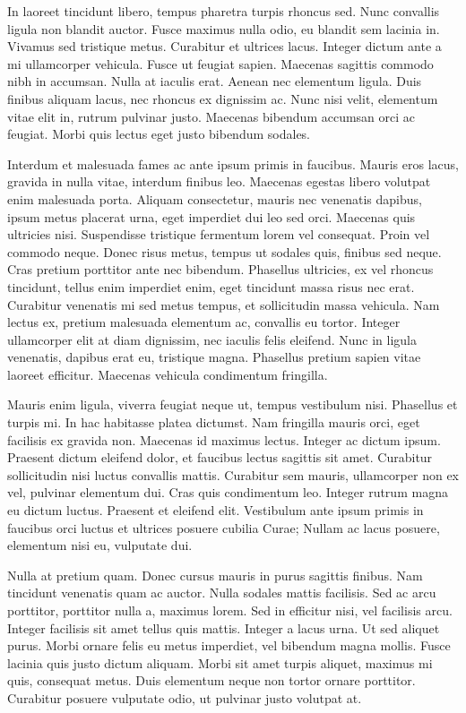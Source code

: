 In laoreet tincidunt libero, tempus pharetra turpis rhoncus sed. Nunc convallis ligula non blandit auctor. Fusce maximus nulla odio, eu blandit sem lacinia in. Vivamus sed tristique metus. Curabitur et ultrices lacus. Integer dictum ante a mi ullamcorper vehicula. Fusce ut feugiat sapien. Maecenas sagittis commodo nibh in accumsan. Nulla at iaculis erat. Aenean nec elementum ligula. Duis finibus aliquam lacus, nec rhoncus ex dignissim ac. Nunc nisi velit, elementum vitae elit in, rutrum pulvinar justo. Maecenas bibendum accumsan orci ac feugiat. Morbi quis lectus eget justo bibendum sodales.

Interdum et malesuada fames ac ante ipsum primis in faucibus. Mauris eros lacus, gravida in nulla vitae, interdum finibus leo. Maecenas egestas libero volutpat enim malesuada porta. Aliquam consectetur, mauris nec venenatis dapibus, ipsum metus placerat urna, eget imperdiet dui leo sed orci. Maecenas quis ultricies nisi. Suspendisse tristique fermentum lorem vel consequat. Proin vel commodo neque. Donec risus metus, tempus ut sodales quis, finibus sed neque. Cras pretium porttitor ante nec bibendum. Phasellus ultricies, ex vel rhoncus tincidunt, tellus enim imperdiet enim, eget tincidunt massa risus nec erat. Curabitur venenatis mi sed metus tempus, et sollicitudin massa vehicula. Nam lectus ex, pretium malesuada elementum ac, convallis eu tortor. Integer ullamcorper elit at diam dignissim, nec iaculis felis eleifend. Nunc in ligula venenatis, dapibus erat eu, tristique magna. Phasellus pretium sapien vitae laoreet efficitur. Maecenas vehicula condimentum fringilla.

Mauris enim ligula, viverra feugiat neque ut, tempus vestibulum nisi. Phasellus et turpis mi. In hac habitasse platea dictumst. Nam fringilla mauris orci, eget facilisis ex gravida non. Maecenas id maximus lectus. Integer ac dictum ipsum. Praesent dictum eleifend dolor, et faucibus lectus sagittis sit amet. Curabitur sollicitudin nisi luctus convallis mattis. Curabitur sem mauris, ullamcorper non ex vel, pulvinar elementum dui. Cras quis condimentum leo. Integer rutrum magna eu dictum luctus. Praesent et eleifend elit. Vestibulum ante ipsum primis in faucibus orci luctus et ultrices posuere cubilia Curae; Nullam ac lacus posuere, elementum nisi eu, vulputate dui.

Nulla at pretium quam. Donec cursus mauris in purus sagittis finibus. Nam tincidunt venenatis quam ac auctor. Nulla sodales mattis facilisis. Sed ac arcu porttitor, porttitor nulla a, maximus lorem. Sed in efficitur nisi, vel facilisis arcu. Integer facilisis sit amet tellus quis mattis. Integer a lacus urna. Ut sed aliquet purus. Morbi ornare felis eu metus imperdiet, vel bibendum magna mollis. Fusce lacinia quis justo dictum aliquam. Morbi sit amet turpis aliquet, maximus mi quis, consequat metus. Duis elementum neque non tortor ornare porttitor. Curabitur posuere vulputate odio, ut pulvinar justo volutpat at. 